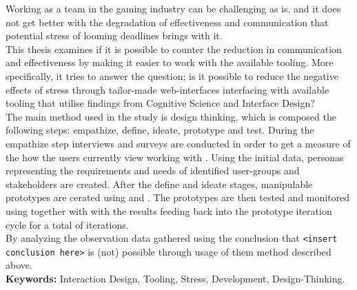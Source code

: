 
Working as a team in the gaming industry can be challenging as is, and it
does not get better with the degradation of effectiveness and communication
that potential stress of looming deadlines brings with it. \\

This thesis examines if it is possible to counter the reduction
in communication and effectiveness by making it easier to work with the
available tooling. More specifically, it tries to answer the question; is it
possible to reduce the negative effects of stress through tailor-made
web-interfaces interfacing with available tooling that utilise findings from
Cognitive Science and Interface Design?  \\

The main method used in the study is design thinking, which is composed the
following steps: empathize, define, ideate, prototype and test. During the
empathize step interviews and surveys are conducted in order to get a measure
of the how the users currently view working with {\shotgun}.
Using the initial data, personas representing the requirements and needs of
identified user-groups and stakeholders are created.
After the define and ideate stages, manipulable prototypes are cerated using
{\python} and {\flask}. The prototypes are then tested and monitored using
{\recordingSystem} together with {\reviewProtocol} with the results
feeding back into the prototype iteration cycle for a total of {\numIterations}
iterations. \\

By analyzing the observation data gathered using {\recordingSystem} the
conclusion that {\texttt{<insert conclusion here>}} is (not) possible through
usage of them method described above. \\

\textbf{Keywords:}
  Interaction Design,
  Tooling,
  Stress,
  Development,
  Design-Thinking.
